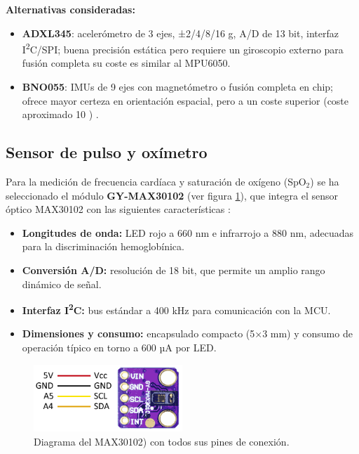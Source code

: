 \documentclass[12pt, a4paper]{article}
\begin{document}
	\noindent\textbf{Alternativas consideradas:}
	\begin{itemize}
		\item \textbf{ADXL345}: acelerómetro de 3 ejes, ±2/4/8/16 g, A/D de 13 bit, interfaz I\textsuperscript{2}C/SPI; buena precisión estática pero requiere un giroscopio externo para fusión completa su coste es similar al MPU6050\cite{ADXL345Datasheet}.
		\item \textbf{BNO055}: IMUs de 9 ejes con magnetómetro o fusión completa en chip; ofrece mayor certeza en orientación espacial, pero a un coste superior (coste aproximado 10 \texteuro{}) \cite{BNO055Datasheet}.
	\end{itemize}

	\subsection{Sensor de pulso y oxímetro}
	
	Para la medición de frecuencia cardíaca y saturación de oxígeno (SpO$_2$) se ha seleccionado el módulo \textbf{GY-MAX30102} (ver figura \ref{fig:max}), que integra el sensor óptico MAX30102 con las siguientes características \cite{MAX30102Datasheet}:
	\begin{itemize}
		\item \textbf{Longitudes de onda:} LED rojo a 660 nm e infrarrojo a 880 nm, adecuadas para la discriminación hemoglobínica.
		\item \textbf{Conversión A/D:} resolución de 18 bit, que permite un amplio rango dinámico de señal.
		\item \textbf{Interfaz I\textsuperscript{2}C:} bus estándar a 400 kHz para comunicación con la MCU.
		\item \textbf{Dimensiones y consumo:} encapsulado compacto (5×3 mm) y consumo de operación típico en torno a 600 µA por LED.
	\end{itemize}
	
		
	\begin{figure}[htbp]
		\centering
		\includegraphics[width=0.5\textwidth]{images/MAX30102.png}
		\caption[Diagrama de pines del MAX30102]{Diagrama del  \mbox{MAX30102)} con todos sus pines de conexión.}
		\label{fig:max}
	\end{figure}
	
\end{document}
